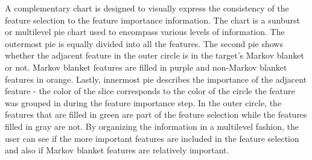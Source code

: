 A complementary chart is designed to visually express the consistency of the feature selection to the feature importance information. The chart is a sunburst or multilevel pie chart used to encompass various levels of information. The outermost pie is equally divided into all the features. The second pie shows whether the adjacent feature in the outer circle is in the target's Markov blanket or not. Markov blanket features are filled in purple and non-Markov blanket features in orange. Lastly, innermost pie describes the importance of the adjacent feature - the color of the slice corresponds to the color of the circle the feature was grouped in during the feature importance step. 
In the outer circle, the features that are filled in green are part of the feature selection while the features filled in gray are not. By organizing the information in a multilevel fashion, the user can see if the more important features are included in the feature selection and also if Markov blanket features are relatively important.

